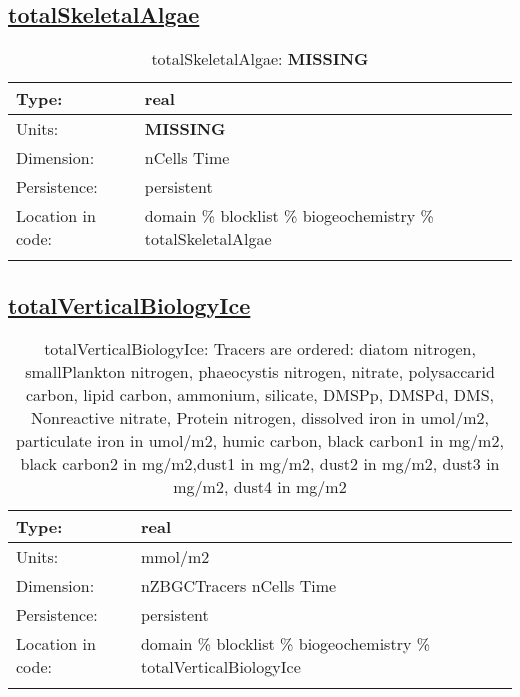 \subsection[totalSkeletalAlgae]{\hyperref[sec:var_tab_biogeochemistry]{totalSkeletalAlgae}}
\label{subsec:var_sec_biogeochemistry_totalSkeletalAlgae}
\begin{center}
\begin{longtable}{| p{2.0in} | p{4.0in} |}
        \hline 
        Type: & real \\
        \hline 
        Units: & {\bf \color{red} MISSING} \\
        \hline 
        Dimension: & nCells Time \\
        \hline 
        Persistence: & persistent \\
        \hline 
         Location in code: & domain \% blocklist \% biogeochemistry \% totalSkeletalAlgae \\
         \hline 
    \caption{totalSkeletalAlgae: {\bf \color{red} MISSING}}
\end{longtable}
\end{center}
\subsection[totalVerticalBiologyIce]{\hyperref[sec:var_tab_biogeochemistry]{totalVerticalBiologyIce}}
\label{subsec:var_sec_biogeochemistry_totalVerticalBiologyIce}
\begin{center}
\begin{longtable}{| p{2.0in} | p{4.0in} |}
        \hline 
        Type: & real \\
        \hline 
        Units: & \si{mmol/m2} \\
        \hline 
        Dimension: & nZBGCTracers nCells Time \\
        \hline 
        Persistence: & persistent \\
        \hline 
         Location in code: & domain \% blocklist \% biogeochemistry \% totalVerticalBiologyIce \\
         \hline 
    \caption{totalVerticalBiologyIce: Tracers are ordered: diatom nitrogen, smallPlankton nitrogen, phaeocystis nitrogen, nitrate, polysaccarid carbon, lipid carbon, ammonium, silicate, DMSPp, DMSPd, DMS, Nonreactive nitrate, Protein nitrogen, dissolved iron in umol/m2, particulate iron in umol/m2, humic carbon, black carbon1 in mg/m2, black carbon2 in mg/m2,dust1 in mg/m2, dust2 in mg/m2, dust3 in mg/m2, dust4 in mg/m2}
\end{longtable}
\end{center}
